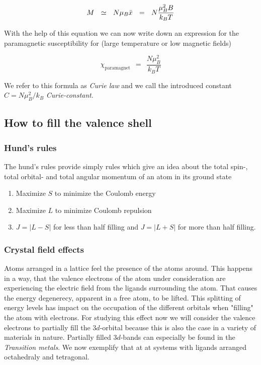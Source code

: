 \documentclass[10pt]{report}
\numberwithin{equation}{chapter}
\begin{document}
\begin{equation}
  M ~~\simeq~~ N \mu_B \Bar{x} ~~=~~ N \frac{\mu_B^2 B}{k_B T}
\end{equation}

With the help of this equation we can now write down an expression for the paramagnetic susceptibility for (large temperature or low magnetic fields)

\begin{equation}
  \chi_\text{paramagnet} ~~=~~ \frac{N \mu_B^2}{k_B T} 
\end{equation}

We refer to this formula as \textit{Curie law} and we call the introduced constant $C = N \mu_B^2/k_B$ \textit{Curie-constant}.


\subsection{How to fill the valence shell}

\subsubsection{Hund's rules}

The hund's rules provide simply rules which give an idea about the total spin-, total orbital- and total angular momentum of an atom in its ground state

\begin{enumerate}
  \item{Maximize $S$ to minimize the Coulomb energy}
  \item{Maximize $L$ to minimize Coulomb repulsion}
  \item{ $J=|L-S|$ for less than half filling and $J=|L+S|$ for more than half filling.}
\end{enumerate}

\subsubsection{Crystal field effects}

Atoms arranged in a lattice feel the presence of the atoms around. This happens in a way, that the valence electrons of the atom under consideration are experiencing the electric field from the ligands surrounding the atom. That causes the energy degenerecy, apparent in a free atom, to be lifted. This splitting of energy levels has impact on the occupation of the different orbitals when "filling" the atom with electrons.
For studying this effect now we will consider the valence electrons to partially fill the $3d$-orbital because this is also the case in a variety of materials in nature. Partially filled $3d$-bands can especially be found in the \textit{Transition metals}. 
 We now exemplify that at at systems with ligands arranged octahedraly and tetragonal. 
\end{document}
